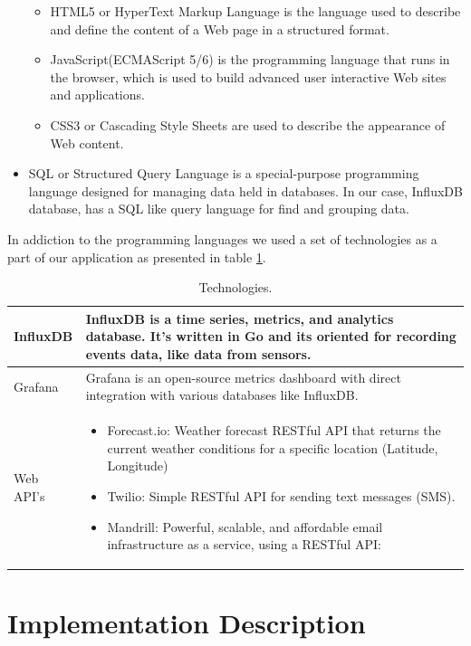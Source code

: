 \documentclass[12pt]{report}
\begin{document}
\begin{itemize}
\begin{itemize}
\item HTML5 or HyperText Markup Language is the language used to describe and define the content of a Web page in a structured format.
\item JavaScript(ECMAScript 5/6) is the programming language that runs in the browser, which is used to build advanced user interactive Web sites and applications.
\item CSS3 or Cascading Style Sheets are used to describe the appearance of Web content.
\end{itemize}
\item SQL or Structured Query Language is a special-purpose programming language designed for managing data held in databases. In our case, InfluxDB database, has a SQL like query language\cite{influxkey} for find and grouping data.

\end{itemize}

In addiction to the programming languages we used a set of technologies as a part of our application as presented in table \ref{tab:tech}.

\begin{table}[H]
\begin{tabularx}{\textwidth}{ |l|X| }
  	\hline
  	InfluxDB & InfluxDB\cite{influx} is a time series, metrics, and analytics database. It’s written in Go and its oriented for recording events data, like data from sensors.\\
 	\hline
 	Grafana & Grafana\cite{grafana} is an open-source metrics dashboard with direct integration with various databases like InfluxDB.\\
  	\hline
 	Web API's &\begin{itemize}
 	\item Forecast.io: Weather forecast RESTful API that returns the current weather conditions for a specific location (Latitude, Longitude)
 	\item Twilio: Simple RESTful API for sending text messages (SMS).
 	\item Mandrill: Powerful, scalable, and affordable email infrastructure as a service, using a RESTful API: 
 	\end{itemize}   \\
	\hline
\end{tabularx}
	\caption{Technologies.}
  	\label{tab:tech}
\end{table}

\section{Implementation Description}
\end{document}
